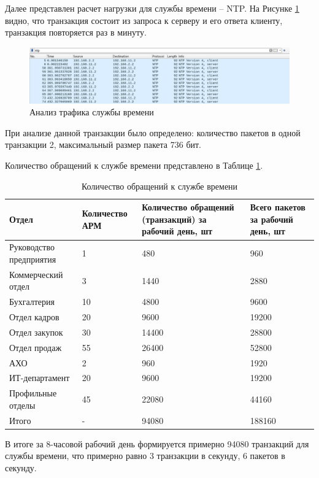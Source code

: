 \documentclass[14pt, a4paper]{extarticle}
\numberwithin{equation}{section}
\begin{document}
Далее представлен расчет нагрузки для службы времени -- NTP. На Рисунке \ref{fig:wireshark_ntp_dump} видно, что
транзакция состоит из запроса к серверу и его ответа клиенту, транзакция повторяется
раз в минуту.

\begin{figure}[H]
        \centering
        \includegraphics[scale=0.5]{ntp_wireshark_dump.png}
        \caption{Анализ трафика службы времени}
        \label{fig:wireshark_ntp_dump}
\end{figure}

При анализе данной транзакции было определено: количество пакетов в одной транзакции 2, максимальный размер пакета 736 бит.

Количество обращений к службе времени представлено в Таблице \ref{table:ntp_requests}.
\begin{table}[H]
\centering
\small
\caption{Количество обращений к службе времени}
\label{table:ntp_requests}
\begin{tabular}{|m{3cm}|m{3cm}|m{4cm}|m{3cm}|}
\hline
\textbf{Отдел} & \textbf{Количество АРМ} & \textbf{Количество обращений (транзакций) за рабочий день, шт } & \textbf{Всего пакетов за рабочий день, шт }\\
\hline
Руководство предприятия & 1 & 480 & 960 \\
\hline
Коммерческий отдел & 3 & 1440 & 2880 \\
\hline
Бухгалтерия & 10 & 4800 & 9600 \\
\hline
Отдел кадров & 20 & 9600 & 19200 \\
\hline
Отдел закупок & 30 & 14400 & 28800 \\
\hline
Отдел продаж & 55 & 26400 & 52800 \\
\hline
АХО & 2 & 960 & 1920 \\
\hline
ИТ-департамент & 20 & 9600 & 19200 \\
\hline
Профильные отделы & 45 & 22080 & 44160 \\
\hline
Итого & - & 94080 & 188160 \\
\hline
\end{tabular}
\end{table}

В итоге за 8-часовой рабочий день формируется примерно 94080 транзакций для службы времени, что примерно равно 
3 транзакции в секунду, 6 пакетов в секунду.
\end{document}

